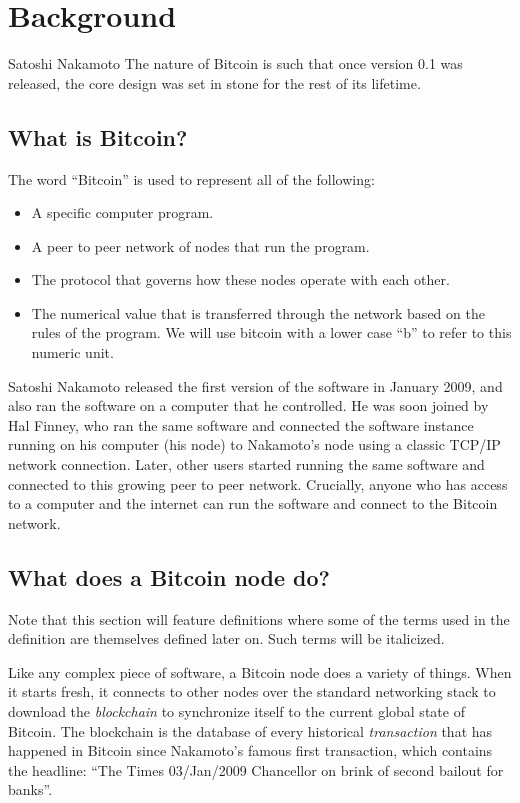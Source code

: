 \chapter{Background}  %
\label{chap:background}

\begin{chapquote}{Satoshi Nakamoto}
The nature of Bitcoin is such that once version 0.1 was released, the core design was set in stone for the rest of its lifetime. 
\end{chapquote}

\section{What is Bitcoin?}
The word ``Bitcoin'' is used to represent all of the following:
\begin{itemize}
    \item A specific computer program.
    \item A peer to peer network of nodes that run the program.
    \item The protocol that governs how these nodes operate with each other.
    \item The numerical value that is transferred through the network based on the rules of the program. We will use bitcoin with a lower case ``b'' to refer to this numeric unit.
\end{itemize}

Satoshi Nakamoto released the first version \cite{satoshi_bitcoin_release_0_1_0} of the software in January 2009, and also ran the software on a computer that he controlled. He was soon joined by Hal Finney, who ran the same software and connected the software instance running on his computer (his node) to Nakamoto's node using a classic TCP/IP network connection. Later, other users started running the same software and connected to this growing peer to peer network. Crucially, anyone who has access to a computer and the internet can run the software and connect to the Bitcoin network. 

\section{What does a Bitcoin node do?}
Note that this section will feature definitions where some of the terms used in the definition are themselves defined later on. Such terms will be italicized. 

Like any complex piece of software, a Bitcoin node does a variety of things. When it starts fresh, it connects to other nodes over the standard networking stack to download the \textit{blockchain} to synchronize itself to the current global state of Bitcoin. The blockchain is the database of every historical \textit{transaction} that has happened in Bitcoin since Nakamoto's famous first transaction, which contains the headline: ``The Times 03/Jan/2009 Chancellor on brink of second bailout for banks''.

